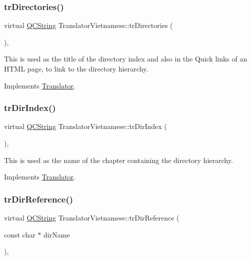 \subsubsection{\texorpdfstring{trDirectories()}{trDirectories()}}
{\footnotesize\ttfamily virtual \mbox{\hyperlink{class_q_c_string}{Q\+C\+String}} Translator\+Vietnamese\+::tr\+Directories (\begin{DoxyParamCaption}{ }\end{DoxyParamCaption})\hspace{0.3cm}{\ttfamily [inline]}, {\ttfamily [virtual]}}

This is used as the title of the directory index and also in the Quick links of an H\+T\+ML page, to link to the directory hierarchy. 

Implements \mbox{\hyperlink{class_translator}{Translator}}.

\mbox{\label{class_translator_vietnamese_aabe2a62caa6ae4bd026ea8ebf7b1408a}} 
\subsubsection{\texorpdfstring{trDirIndex()}{trDirIndex()}}
{\footnotesize\ttfamily virtual \mbox{\hyperlink{class_q_c_string}{Q\+C\+String}} Translator\+Vietnamese\+::tr\+Dir\+Index (\begin{DoxyParamCaption}{ }\end{DoxyParamCaption})\hspace{0.3cm}{\ttfamily [inline]}, {\ttfamily [virtual]}}

This is used as the name of the chapter containing the directory hierarchy. 

Implements \mbox{\hyperlink{class_translator}{Translator}}.

\mbox{\label{class_translator_vietnamese_acaafc303a705375b5fd709deb1985d1f}} 
\subsubsection{\texorpdfstring{trDirReference()}{trDirReference()}}
{\footnotesize\ttfamily virtual \mbox{\hyperlink{class_q_c_string}{Q\+C\+String}} Translator\+Vietnamese\+::tr\+Dir\+Reference (\begin{DoxyParamCaption}\item[{const char $\ast$}]{dir\+Name }\end{DoxyParamCaption})\hspace{0.3cm}{\ttfamily [inline]}, {\ttfamily [virtual]}}

